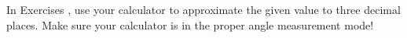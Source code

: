 {\noindent In Exercises}
{, use your calculator to approximate the given value to three decimal places.  Make sure your calculator is in the proper angle measurement mode!}
